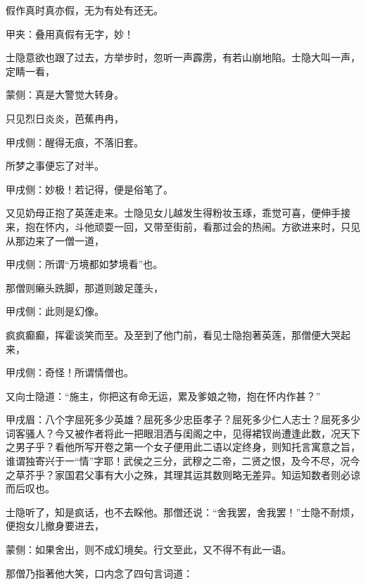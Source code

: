 \begin{poem}
    \begin{pl}假作真时真亦假，无为有处有还无。\end{pl}
    \begin{note}甲夹：叠用真假有无字，妙！\end{note}
\end{poem}


\begin{parag}
    士隐意欲也跟了过去，方举步时，忽听一声霹雳，有若山崩地陷。士隐大叫一声，定睛一看，\begin{note}蒙侧：真是大警觉大转身。\end{note}只见烈日炎炎，芭蕉冉冉，\begin{note}甲戌侧：醒得无痕，不落旧套。\end{note}所梦之事便忘了对半。\begin{note}甲戌侧：妙极！若记得，便是俗笔了。\end{note}
\end{parag}


\begin{parag}
    又见奶母正抱了英莲走来。士隐见女儿越发生得粉妆玉琢，乖觉可喜，便伸手接来，抱在怀内，斗他顽耍一回，又带至街前，看那过会的热闹。方欲进来时，只见从那边来了一僧一道，\begin{note}甲戌侧：所谓“万境都如梦境看”也。\end{note}那僧则癞头跣脚，那道则跛足蓬头，\begin{note}甲戌侧：此则是幻像。\end{note}疯疯癫癫，挥霍谈笑而至。及至到了他门前，看见士隐抱著英莲，那僧便大哭起来，\begin{note}甲戌侧：奇怪！所谓情僧也。\end{note}又向士隐道：“施主，你把这有命无运，累及爹娘之物，抱在怀内作甚？”\begin{note}甲戌眉：八个字屈死多少英雄？屈死多少忠臣孝子？屈死多少仁人志士？屈死多少词客骚人？今又被作者将此一把眼泪洒与闺阁之中，见得裙钗尚遭逢此数，况天下之男子乎？看他所写开卷之第一个女子便用此二语以定终身，则知托言寓意之旨，谁谓独寄兴于一“情”字耶！武侯之三分，武穆之二帝，二贤之恨，及今不尽，况今之草芥乎？家国君父事有大小之殊，其理其运其数则略无差异。知运知数者则必谅而后叹也。\end{note}士隐听了，知是疯话，也不去睬他。那僧还说：“舍我罢，舍我罢！”士隐不耐烦，便抱女儿撤身要进去，\begin{note}蒙侧：如果舍出，则不成幻境矣。行文至此，又不得不有此一语。\end{note}那僧乃指著他大笑，口内念了四句言词道：
\end{parag}


